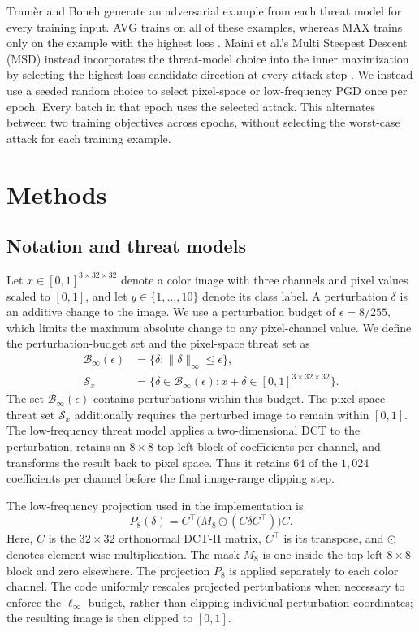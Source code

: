 \documentclass[11pt]{article}
\newcommand{\linf}{\ell_\infty}
\begin{document}
Tram\`er and Boneh generate an adversarial example from each threat model for
every training input. AVG trains on all of these examples, whereas MAX trains
only on the example with the highest loss \cite{tramer2019}. Maini
et al.'s Multi Steepest Descent (MSD) instead incorporates the threat-model
choice into the inner maximization by selecting the highest-loss candidate
direction at every attack step \cite{maini2020}. We instead use a
seeded random choice to select pixel-space or low-frequency PGD once per
epoch. Every batch in that epoch uses the selected attack. This alternates
between two training objectives across epochs, without selecting the
worst-case attack for each training example.

\section{Methods}
\label{sec:methods}

\subsection{Notation and threat models}
Let $x\in[0,1]^{3\times32\times32}$ denote a color image with three channels
and pixel values scaled to $[0,1]$, and let $y\in\{1,\ldots,10\}$ denote its
class label. A perturbation $\delta$ is an additive change to the image. We
use a perturbation budget of $\epsilon=8/255$, which limits the maximum
absolute change to any pixel-channel value.
We define the perturbation-budget set and the pixel-space threat set as
\[
\begin{aligned}
\mathcal{B}_\infty(\epsilon)
  &=\{\delta:\lVert\delta\rVert_\infty\leq\epsilon\},\\
\mathcal{S}_x
  &=\{\delta\in\mathcal{B}_\infty(\epsilon):
      x+\delta\in[0,1]^{3\times32\times32}\}.
\end{aligned}
\]
The set $\mathcal{B}_\infty(\epsilon)$ contains perturbations within this
budget. The pixel-space threat set $\mathcal{S}_x$ additionally requires the
perturbed image to remain within $[0,1]$.
The low-frequency threat model
applies a two-dimensional DCT to the perturbation, retains an $8\times8$
top-left block of coefficients per channel, and transforms the result back to
pixel space. Thus it retains $64$ of the $1{,}024$ coefficients per channel
before the final image-range clipping step.

The low-frequency projection used in the implementation is
\begin{equation}
  P_8(\delta)=C^\top\bigl(M_8\odot(C\delta C^\top)\bigr)C.
  \label{eq:dct-projection}
\end{equation}
Here, $C$ is the $32\times32$ orthonormal DCT-II matrix, $C^\top$ is its
transpose, and $\odot$ denotes element-wise multiplication. The mask $M_8$
is one inside the top-left $8\times8$ block and zero elsewhere. The
projection $P_8$ is applied separately to each color channel.
The code uniformly rescales projected perturbations when necessary to enforce
the $\linf$ budget, rather than clipping individual perturbation coordinates;
the resulting image is then clipped to $[0,1]$.
\end{document}
